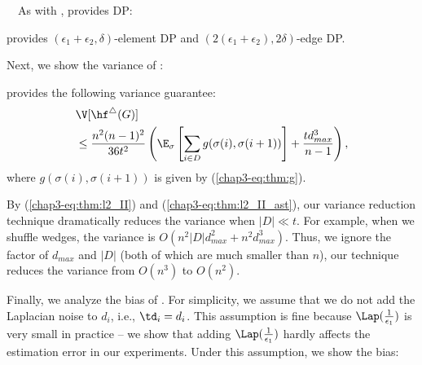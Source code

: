 \smallskip
{}~~As with \AlgWSTri{}, \AlgWSTriVR{} provides DP: 

\begin{theorem}
\label{chap3-thm:DP_II_ast}
\AlgWSTri{} provides $(\epsilon_1 + \epsilon_2, \delta)$-element DP and $(2(\epsilon_1 + \epsilon_2), 2\delta)$-edge DP. 
\end{theorem}


Next, we show the variance of \AlgWSTriVR{}:

\begin{theorem}
\label{chap3-thm:var_II_ast}
\AlgWSTriVR{} provides the following variance guarantee:
\begin{align}
& \V[\hf^\triangle(G)] \nonumber\\ 
& \leq \frac{n^2(n-1)^2}{36t^2} \left(\E_\sigma \left[ \sum_{i \in D} 
g(\sigma(i),\sigma(i+1)) \right] + \frac{t d_{max}^3}{n-1}\right), \label{chap3-eq:thm:l2_II_ast}
\end{align}
where $g(\sigma(i),\sigma(i+1))$ is given by (\ref{chap3-eq:thm:g}). 
\end{theorem}
By (\ref{chap3-eq:thm:l2_II}) and (\ref{chap3-eq:thm:l2_II_ast}), our variance reduction technique dramatically reduces the variance when $|D| \ll t$. 
For example, when we shuffle wedges, the variance is $O(n^2|D|d_{max}^2 + n^2 d_{max}^3)$. 
Thus, we ignore the factor of $d_{max}$ and $|D|$ (both of which are much smaller than $n$), our technique reduces the variance from $O(n^3)$ to $O(n^2)$. 

Finally, we analyze the bias of \AlgWSTriVR{}. 
For simplicity, we assume that we do not add the Laplacian noise to $d_i$, i.e., $\td_i = d_i$. 
This assumption is fine because 
$\Lap(\frac{1}{\epsilon_1})$ is very small in practice -- we show that adding $\Lap(\frac{1}{\epsilon_1})$ hardly affects the estimation error in our experiments. 
Under this assumption, we show the bias: 

